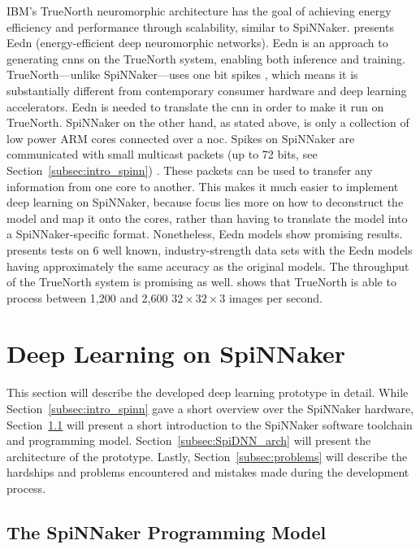\documentclass[]{article}
\begin{document}
IBM's TrueNorth neuromorphic architecture has the goal of
achieving energy efficiency and performance through scalability,
similar to SpiNNaker.
\citet{esser_et_al_2016} presents Eedn (energy-efficient deep
neuromorphic networks).
Eedn is an approach to generating \acrshort{cnn}s on the TrueNorth system,
enabling both inference and training.
TrueNorth---unlike SpiNNaker---uses one bit spikes
\citep{esser_et_al_2016}, which means it is substantially different
from contemporary consumer hardware and deep learning accelerators.
Eedn is needed to translate the \acrshort{cnn} in order to make it run on
TrueNorth.
SpiNNaker on the other hand, as stated above, is only a collection
of low power ARM cores connected over a \acrshort{noc}.
Spikes on SpiNNaker are communicated with small multicast packets
(up to 72 bits, see Section~\ref{subsec:intro_spinn})
\citep{furber_et_al_2020}.
These packets can be used to transfer any information from one core
to another.
This makes it much easier to implement deep learning on SpiNNaker,
because focus lies more on how to deconstruct the model and map it
onto the cores, rather than having to translate the model into a
SpiNNaker-specific format.
Nonetheless, Eedn models show promising results.
\citet{esser_et_al_2016} presents tests on 6 well known,
industry-strength data sets with the Eedn models having approximately
the same accuracy as the original models.
The throughput of the TrueNorth system is promising as well.
\citet{esser_et_al_2016} shows that TrueNorth is able to process
between 1,200 and 2,600 $32\times32\times3$ images per second.



\section{Deep Learning on SpiNNaker} %
\label{sec:SpiDNN}

This section will describe the developed deep learning prototype in
detail.
While Section~\ref{subsec:intro_spinn} gave a short overview over the
SpiNNaker hardware, Section~\ref{subsec:spinn_toolchain} will present
a short introduction to the SpiNNaker software toolchain and
programming model.
Section~\ref{subsec:SpiDNN_arch} will present the architecture of the
prototype.
Lastly, Section~\ref{subsec:problems} will describe the
hardships and problems encountered and mistakes made during the
development process.


\subsection{The SpiNNaker Programming Model} %
\label{subsec:spinn_toolchain}
\end{document}
